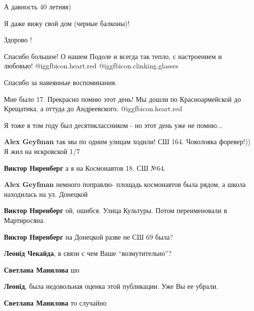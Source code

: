 \begin{itemize}
\begin{itemize}
А давность 40 летняя)

\end{itemize} %

Я даже вижу свой дом (черные балконы)!


Здорово !


Спасибо большое! О нашем Подоле и всегда так тепло, с настроением и любовью!
@igg{fbicon.heart.red} @igg{fbicon.clinking.glasses} 


Спасибо за навеянные воспоминания.


Мне было 17. Прекрасно помню этот день! Мы дошли по Красноармейской до
Крещатика, а оттуда до Андреевского. @igg{fbicon.heart.red}

Я тоже в том году был десятиклассником - но этот день уже не помню...

\begin{itemize} %
\textbf{Alex Geyfman} так мы по одним улицам ходили! СШ 164. Чоколовка форевер!)) Я жил на искровской 1/7

\textbf{Виктор Ниренберг} а я на Космонавтов 18. СШ №64.

\textbf{Alex Geyfman} немного поправлю- площадь космонавтов была рядом, а школа находилась на ул. Донецкой

\textbf{Виктор Ниренберг} ой, ошибся. Улица Культуры. Потом переименовали в Мартиросяна.

\textbf{Виктор Ниренберг} на Донецкой разве не СШ 69 была?
\end{itemize} %

\textbf{Леонід Чекайда}, в связи с чем Ваше \enquote{возмутительно}?

\begin{itemize} %
\textbf{Светлана Манилова} шо

\textbf{Леонід}, была недовольная оценка этой публикации. Уже Вы ее убрали.

\textbf{Светлана Манилова} то случайно
\end{itemize} %


\end{itemize}
